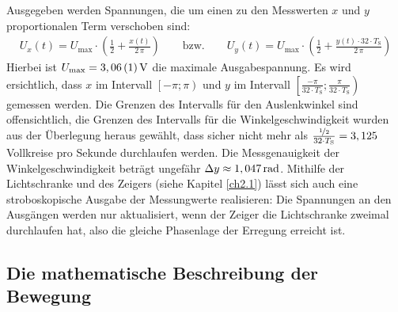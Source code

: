 \documentclass[numbers=noenddot,12pt,a4paper]{scrartcl}
\newcommand{\ix}[1]{_\text{#1}}
\begin{document}
Ausgegeben werden Spannungen, die um einen zu den Messwerten $x$ und $y$ proportionalen Term verschoben sind:
\begin{align}
U_x(t)=U\ix{max}\cdot\left(\frac{1}{2}+\frac{x(t)}{2\,\pi}\right)\hspace{2em}\text{bzw.}\hspace{2em}U_y(t)=U\ix{max}\cdot\left(\frac{1}{2}+\frac{y(t)\cdot 32\cdot T\ix{S}}{2\,\pi}\right)
\end{align}
Hierbei ist $U\ix{max}=\unit[3,06\,(1)]{V}$ die maximale Ausgabespannung. Es wird ersichtlich, dass $x$ im Intervall $\left[-\pi;\pi\right)$ und $y$ im Intervall $\left[\frac{-\pi}{32\cdot T\ix{S}};\frac{\pi}{32\cdot T\ix{S}}\right)$ gemessen werden. Die Grenzen des Intervalls für den Auslenkwinkel sind offensichtlich, die Grenzen des Intervalls für die Winkelgeschwindigkeit wurden aus der Überlegung heraus gewählt, dass sicher nicht mehr als $\frac{\nicefrac{1}{2}}{32\cdot T\ix{S}}=3,125$ Vollkreise pro Sekunde durchlaufen werden. Die Messgenauigkeit der Winkelgeschwindigkeit beträgt ungefähr $\Delta y\approx\unit[1,047]{rad}$. Mithilfe der Lichtschranke und des Zeigers (siehe Kapitel \ref{ch2.1}) lässt sich auch eine stroboskopische Ausgabe der Messungwerte realisieren: Die Spannungen an den Ausgängen werden nur aktualisiert, wenn der Zeiger die Lichtschranke zweimal durchlaufen hat, also die gleiche Phasenlage der Erregung erreicht ist.
\subsection{Die mathematische Beschreibung der Bewegung}
\end{document}
